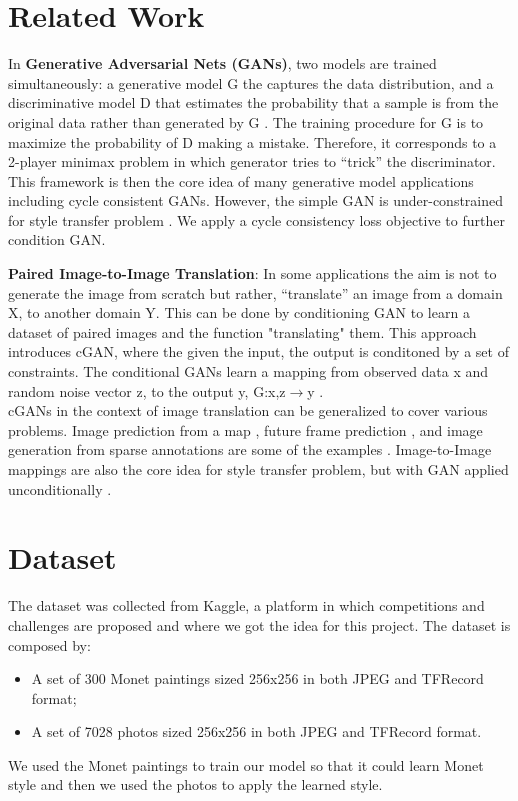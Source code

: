 \documentclass[10pt,twocolumn,letterpaper]{article}
\begin{document}
\section{Related Work}
In \textbf{Generative Adversarial Nets (GANs)}, two models are trained simultaneously: a generative model G the captures the data distribution, and a discriminative model D that estimates the probability that a sample is from the original data rather than generated by G \cite{simplegan}. The training procedure for G is to maximize the probability of D making a mistake. Therefore, it corresponds to a 2-player minimax problem in which generator tries to “trick” the discriminator. This framework is then the core idea of many generative model applications including cycle consistent GANs. However, the simple GAN is under-constrained for style transfer problem \cite{cyclegan}. We apply a cycle consistency loss objective to further condition GAN.  

 \textbf{Paired Image-to-Image Translation}: In some applications the aim is not to generate the image from scratch but rather, “translate” an image from a domain X, to another domain Y.  This can be done by conditioning GAN to learn a dataset of paired images and the function "translating" them. This approach introduces cGAN, where the given the input, the output is conditoned by a set of constraints. The conditional GANs learn a mapping from observed data x and random noise vector z, to the output y, G:{x,z}$\rightarrow$y \cite{imgtoimg}.
\\ cGANs in the context of image translation can be generalized to cover various problems. Image prediction from a map \cite{example1}, future frame prediction \cite{example2}, and image generation from sparse annotations are some of the examples \cite{example3}. Image-to-Image mappings are also the core idea for style transfer problem, but with GAN applied unconditionally \cite{example4}.\\

\section{Dataset}

The dataset was collected from Kaggle, a platform in which competitions and challenges are proposed and where we got the idea for this project. The dataset is composed by:
\begin{itemize}
\item A set of 300 Monet paintings sized 256x256 in both JPEG and TFRecord format;
\item A set of 7028 photos sized 256x256 in both JPEG and TFRecord format.
\end{itemize}
We used the Monet paintings to train our model so that it could learn Monet style and then we used the photos to apply the learned style. 
\end{document}

